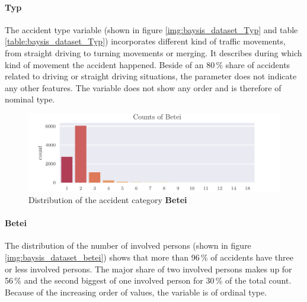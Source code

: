 \paragraph{Typ}
The accident type variable (shown in figure \autoref{img:baysis_dataset_Typ} and table \autoref{table:baysis_dataset_Typ}) incorporates different kind of traffic movements, from straight driving to turning movements or merging. It describes during which kind of movement the accident happened. Beside of an 80\,\% share of accidents related to driving or straight driving situations, the parameter does not indicate any other features. The variable does not show any order and is therefore of nominal type.

\begin{figure}[!ht]
	\centering
	\includegraphics[scale=1.0]{CorrAnalysis/data/BAYSIS/01_dataset/plots/baysis_dataset_count_Betei}
	\caption{Distribution of the accident category \textbf{Betei}}
	\label{img:baysis_dataset_betei}
\end{figure}
\paragraph{Betei}
The distribution of the number of involved persons (shown in figure \autoref{img:baysis_dataset_betei}) shows that more than 96\,\% of accidents have three or less involved persons. The major share of two involved persons makes up for 56\,\% and the second biggest of one involved person for 30\,\% of the total count. Because of the increasing order of values, the variable is of ordinal type.




